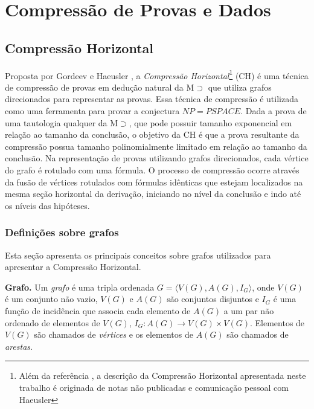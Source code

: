 
\chapter{Compressão de Provas e Dados}
\label{cap:comp_prov_dado}

\section{Compressão Horizontal}
\label{sec:comp_hor}

Proposta por Gordeev e Haeusler \cite{GordeevH16}, a \textit{Compressão Horizontal}\footnote{Além da referência \cite{GordeevH16}, a descrição da Compressão Horizontal apresentada neste trabalho é originada de notas não publicadas \cite{GorHaeHCNonPub} e comunicação pessoal com Haeusler} (CH) é uma técnica de compressão de provas em dedução natural da M$\supset$ que utiliza grafos direcionados para representar as provas. Essa técnica de compressão é utilizada como uma ferramenta para provar a conjectura $NP = PSPACE$. Dada a prova de uma tautologia qualquer da M$\supset$, que pode possuir tamanho exponencial em relação ao tamanho da conclusão, o objetivo da CH é que a prova resultante da compressão possua tamanho polinomialmente limitado em relação ao tamanho da conclusão. Na representação de provas utilizando grafos direcionados, cada vértice do grafo é rotulado com uma fórmula. O processo de compressão ocorre através da fusão de vértices rotulados com fórmulas idênticas que estejam localizados na mesma seção horizontal da derivação, iniciando no nível da conclusão e indo até os níveis das hipóteses.

\subsection{Definições sobre grafos}

Esta seção apresenta os principais conceitos sobre grafos utilizados para apresentar a Compressão Horizontal.

\begin{definition}{\textbf{Grafo.}}
Um \textit{grafo} é uma tripla ordenada $G = \langle V(G), A(G), I_G\rangle$, onde $V(G)$ é um conjunto não vazio, $V(G)$ e $A(G)$ são conjuntos disjuntos e $I_G$ é uma função de incidência que associa cada elemento de $A(G)$ a um par não ordenado de elementos de $V(G)$, $I_G: A(G) \rightarrow V(G) \times V(G)$. Elementos de $V(G)$ são chamados de \textit{vértices} e os elementos de $A(G)$ são chamados de \textit{arestas}.
\end{definition}

